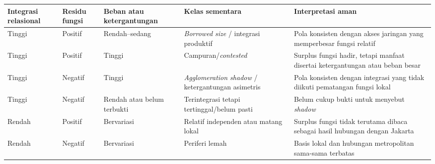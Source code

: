 \documentclass[
  indonesian,
  11pt,
  a4paper,
  oneside,
  openany]{report}
\newcounter{none} %
\begin{document}
{\def\LTcaptype{none} %
\begin{longtable}[]{@{}
  >{\raggedright\arraybackslash}p{}
  >{\raggedleft\arraybackslash}p{}
  >{\raggedleft\arraybackslash}p{}
  >{\raggedright\arraybackslash}p{}
  >{\raggedright\arraybackslash}p{}@{}}
\toprule\noalign{}
\begin{minipage}[b]{\linewidth}\raggedright
Integrasi relasional
\end{minipage} & \begin{minipage}[b]{\linewidth}\raggedleft
Residu fungsi
\end{minipage} & \begin{minipage}[b]{\linewidth}\raggedleft
Beban atau ketergantungan
\end{minipage} & \begin{minipage}[b]{\linewidth}\raggedright
Kelas sementara
\end{minipage} & \begin{minipage}[b]{\linewidth}\raggedright
Interpretasi aman
\end{minipage} \\
\midrule\noalign{}
\endhead
\bottomrule\noalign{}
\endlastfoot
Tinggi & Positif & Rendah--sedang & \emph{Borrowed size} / integrasi
produktif & Pola konsisten dengan akses jaringan yang memperbesar fungsi
relatif \\
Tinggi & Positif & Tinggi & Campuran/\allowbreak{}\emph{contested} &
Surplus fungsi hadir, tetapi manfaat disertai ketergantungan atau beban
besar \\
Tinggi & Negatif & Tinggi & \emph{Agglomeration shadow} / ketergantungan
asimetris & Pola konsisten dengan integrasi yang tidak diikuti
pematangan fungsi lokal \\
Tinggi & Negatif & Rendah atau belum terbukti & Terintegrasi tetapi
tertinggal/belum pasti & Belum cukup bukti untuk menyebut
\emph{shadow} \\
Rendah & Positif & Bervariasi & Relatif independen atau matang lokal &
Surplus fungsi tidak terutama dibaca sebagai hasil hubungan dengan
Jakarta \\
Rendah & Negatif & Bervariasi & Periferi lemah & Basis lokal dan
hubungan metropolitan sama-sama terbatas \\
\end{longtable}
}
\end{document}
